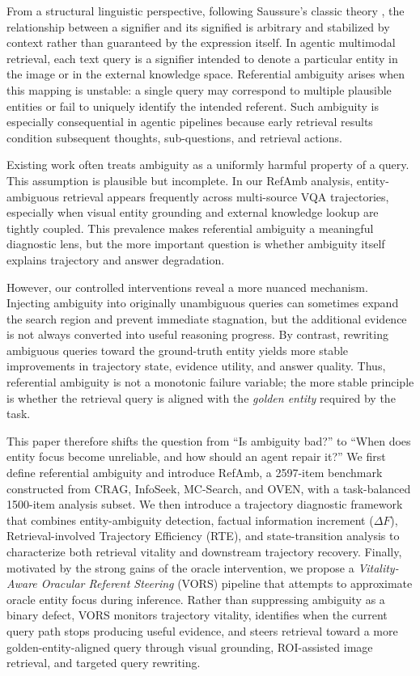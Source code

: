 \documentclass{article}
\begin{document}
From a structural linguistic perspective, following Saussure's classic theory \cite{de1916nature}, the relationship between a signifier and its signified is arbitrary and stabilized by context rather than guaranteed by the expression itself.
In agentic multimodal retrieval, each text query is a signifier intended to denote a particular entity in the image or in the external knowledge space.
Referential ambiguity arises when this mapping is unstable: a single query may correspond to multiple plausible entities or fail to uniquely identify the intended referent.
Such ambiguity is especially consequential in agentic pipelines because early retrieval results condition subsequent thoughts, sub-questions, and retrieval actions.

Existing work often treats ambiguity as a uniformly harmful property of a query.
This assumption is plausible but incomplete.
In our RefAmb analysis, entity-ambiguous retrieval appears frequently across multi-source VQA trajectories, especially when visual entity grounding and external knowledge lookup are tightly coupled.
This prevalence makes referential ambiguity a meaningful diagnostic lens, but the more important question is whether ambiguity itself explains trajectory and answer degradation.

However, our controlled interventions reveal a more nuanced mechanism.
Injecting ambiguity into originally unambiguous queries can sometimes expand the search region and prevent immediate stagnation, but the additional evidence is not always converted into useful reasoning progress.
By contrast, rewriting ambiguous queries toward the ground-truth entity yields more stable improvements in trajectory state, evidence utility, and answer quality.
Thus, referential ambiguity is not a monotonic failure variable; the more stable principle is whether the retrieval query is aligned with the \emph{golden entity} required by the task.

This paper therefore shifts the question from ``Is ambiguity bad?'' to ``When does entity focus become unreliable, and how should an agent repair it?''
We first define referential ambiguity and introduce RefAmb, a 2597-item benchmark constructed from CRAG, InfoSeek, MC-Search, and OVEN, with a task-balanced 1500-item analysis subset.
We then introduce a trajectory diagnostic framework that combines entity-ambiguity detection, factual information increment ($\Delta F$), Retrieval-involved Trajectory Efficiency (RTE), and state-transition analysis to characterize both retrieval vitality and downstream trajectory recovery.
Finally, motivated by the strong gains of the oracle intervention, we propose a \emph{Vitality-Aware Oracular Referent Steering} (VORS) pipeline that attempts to approximate oracle entity focus during inference.
Rather than suppressing ambiguity as a binary defect, VORS monitors trajectory vitality, identifies when the current query path stops producing useful evidence, and steers retrieval toward a more golden-entity-aligned query through visual grounding, ROI-assisted image retrieval, and targeted query rewriting.
\end{document}
